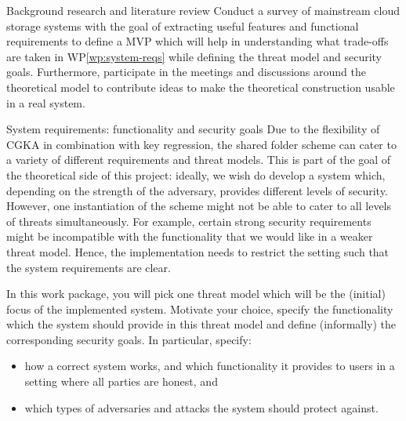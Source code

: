 \documentclass[E]{BAMASA}
\begin{document}
\begin{workpackage}{Background research and literature review}
Conduct a survey of mainstream cloud storage systems with the goal of extracting useful features and functional requirements to define a MVP which will help in understanding what trade-offs are taken in WP\ref{wp:system-reqs} while defining the threat model and security goals. 
Furthermore, participate in the meetings and discussions around the theoretical model to contribute ideas to make the theoretical construction usable in a real system.

\end{workpackage}

\begin{workpackage}{System requirements: functionality and security goals}\label{wp:system-reqs}
    Due to the flexibility of CGKA in combination with key regression, the shared folder scheme can cater to a variety of different requirements and threat models.
    This is part of the goal of the theoretical side of this project: 
    ideally, we wish do develop a system which, depending on the strength of the adversary, provides different levels of security.
    However, one instantiation of the scheme might not be able to cater to all levels of threats simultaneously.
    For example, certain strong security requirements might be incompatible with the functionality that we would like in a weaker threat model.
    Hence, the implementation needs to restrict the setting such that the system requirements are clear.
    
    In this work package, you will pick one threat model which will be the (initial) focus of the implemented system.
    Motivate your choice, specify the functionality which the system should provide in this threat model and define (informally) the corresponding security goals.
    In particular, specify:
    \begin{itemize}
        \item how a correct system works, and which functionality it provides to users in a setting where all parties are honest, and
        \item which types of adversaries and attacks the system should protect against.
    \end{itemize}
\end{workpackage}
\end{document}
